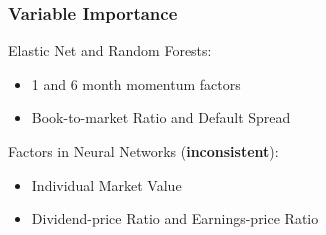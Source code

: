 \documentclass[aspectratio=169]{beamer}
\begin{document}

\begin{frame}
\frametitle{Variable Importance}
Elastic Net and Random Forests:
\begin{itemize}
\item 1 and 6 month momentum factors
\item Book-to-market Ratio and Default Spread
\end{itemize}
Factors in Neural Networks (\textbf{inconsistent}):
\begin{itemize}
\item Individual Market Value 
\item Dividend-price Ratio and Earnings-price Ratio 
\end{itemize}
\end{frame}

\end{document}

